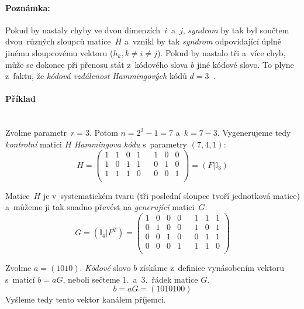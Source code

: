 \documentclass[thesis=M,czech,hidelinks]{FITthesis}[2012/06/26]
\newcommand{\0}{{\textcolor[gray]{0.75}{0}}}
\begin{document}
\paragraph{Poznámka:} Pokud by nastaly chyby ve dvou dimenzích~$i$~a~$j$,
\emph{syndrom} by tak byl součtem dvou~různých sloupců matice~$H$ a~vznikl by
tak \emph{syndrom} odpovídající úplně jinému sloupcovému vektoru
($h_k, k \neq i \neq j$). Pokud by nastalo tři a~více chyb, může se dokonce při
přenosu stát z~kódového slova $b$ jiné kódové slovo. To plyne z~faktu, že
\emph{kódová vzdálenost} \emph{Hammingových} kódů $d=3$~\cite{Adamek}.


\paragraph{Příklad} \hfill \\
Zvolme parametr~$r = 3$. Potom $n = 2^3 - 1 = 7$ a~$k = 7-3$. Vygenerujeme tedy
\emph{kontrolní} matici $H$ \emph{Hammingova kódu} s~parametry $(7,4,1)$:
$$
    H = \left(
    \begin{array}{*{8}{c}}
        1 & 1 & 0 & 1 & & 1 & 0 & 0 \\
        1 & 0 & 1 & 1 & & 0 & 1 & 0 \\
        1 & 1 & 1 & 0 & & 0 & 0 & 1 \\
    \end{array}
    \right) = \left( F | \mathbb{I}_3 \right)
$$

Matice~$H$ je v~systematickém tvaru (tři poslední sloupce tvoří jednotková
matice) a~můžeme ji tak snadno převést na \emph{generující} matici~$G$:
$$
    G = \left( \mathbb{I}_4 | F^T \right) = \left(
    \begin{array}{*{8}{c}}
        1 & 0 & 0 & 0 & & 1 & 1 & 1 \\
        0 & 1 & 0 & 0 & & 1 & 0 & 1 \\
        0 & 0 & 1 & 0 & & 0 & 1 & 1 \\
        0 & 0 & 0 & 1 & & 1 & 1 & 0 \\
    \end{array}
    \right)
$$

Zvolme $a=(1010)$. \emph{Kódové} slovo $b$ získáme z~definice vynásobením
vektoru s~maticí $b = aG$, neboli sečteme 1.~a~3.~řádek matice $G$.
$$ b = aG = (1010100) $$
Vyšleme tedy tento vektor kanálem příjemci.
\end{document}
